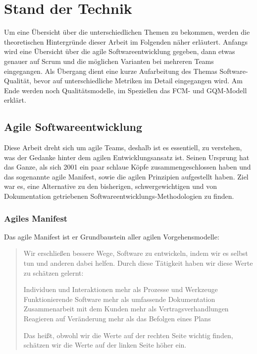 \chapter{Stand der Technik}

Um eine Übersicht über die unterschiedlichen Themen zu bekommen, werden die theoretischen Hintergründe dieser Arbeit im Folgenden näher erläutert.
Anfangs wird eine Übersicht über die agile Softwareentwicklung gegeben, dann etwas genauer auf Scrum und die möglichen Varianten bei mehreren Teams eingegangen.
Als Übergang dient eine kurze Aufarbeitung des Themas Software-Qualität, bevor auf unterschiedliche Metriken im Detail eingegangen wird.
Am Ende werden noch Qualitätsmodelle, im Speziellen das \ac{FCM}- und \ac{GQM}-Modell erklärt.

\section{Agile Softwareentwicklung}

Diese Arbeit dreht sich um agile Teams, deshalb ist es essentiell, zu verstehen, was der Gedanke hinter dem agilen Entwicklungsansatz ist.
Seinen Ursprung hat das Ganze, als sich 2001 ein paar schlaue Köpfe zusammengeschlossen haben und das sogenannte agile Manifest, sowie die agilen Prinzipien aufgestellt haben.
Ziel war es, eine Alternative zu den bisherigen, schwergewichtigen und von Dokumentation getriebenen Softwareentwicklungs-Methodologien zu finden.

\subsection{Agiles Manifest}

Das agile Manifest ist er Grundbaustein aller agilen Vorgehensmodelle:

\begin{quote}Wir erschließen bessere Wege, Software zu entwickeln,
indem wir es selbst tun und anderen dabei helfen.
Durch diese Tätigkeit haben wir diese Werte zu schätzen gelernt: \newline
\begin{center}
Individuen und Interaktionen mehr als Prozesse und Werkzeuge \newline
Funktionierende Software mehr als umfassende Dokumentation \newline
Zusammenarbeit mit dem Kunden mehr als Vertragsverhandlungen \newline
Reagieren auf Veränderung mehr als das Befolgen eines Plans \newline
\end{center}
Das heißt, obwohl wir die Werte auf der rechten Seite wichtig finden,
schätzen wir die Werte auf der linken Seite höher ein.\end{quote}\cite{agile_manifest}

